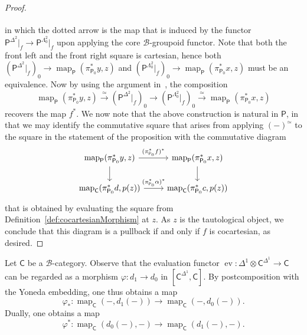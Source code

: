 \documentclass[reqno]{amsart}
\numberwithin{equation}{subsection}
\theoremstyle{plain}
\theoremstyle{definition}
\let\scr=\mathcal
\let\phi=\varphi
\def\BB{\scr B}
\DeclareMathOperator{\ev}{ev}
\DeclareMathOperator{\Map}{map}
\newcommand{\map}[1]{\Map_{#1}}
\newcommand{\I}[1]{\mathsf{#1}}
\newcommand{\iFun}[2]{{[#1,#2]}}
\begin{document}
\begin{proof}
\begin{equation*}
\begin{tikzcd}[column sep={5.8em,between origins}, row sep={4em,between origins}]
		\end{tikzcd}
	\end{equation*}
	in which the dotted arrow is the map that is induced by the functor $\I{P}^{\Delta^2}\vert_f\to \I{P}^{\Lambda^2_0}\vert_f$ upon applying the core $\BB$-groupoid functor. Note that both the front left and the front right square is cartesian, hence both  $(\I{P}^{\Delta^2}\vert_f)_0\to \map{\I{P}}(\pi_{\I{P}_0}^\ast y,z)$ and $(\I{P}^{\Lambda^2_0}\vert_f)_0\to \map{\I{P}}(\pi_{\I{P}_0}^\ast x,z)$ must be an equivalence. Now by using the argument in~\cite[Remark~4.7.7]{Martini2021}, the composition
	\begin{equation*}
	\map{\I{P}}(\pi_{\I{P}_0}^\ast y,z)\xrightarrow{\simeq} (\I{P}^{\Delta^2}\vert_f)_0\rightarrow (\I{P}^{\Lambda^2_0}\vert_f)_0\xrightarrow{\simeq} \map{\I{P}}(\pi_{\I{P}_0}^\ast x,z)
	\end{equation*}
	recovers the map $f^\ast$. We now note that the above construction is natural in $\I{P}$, in that we may identify the commutative square that arises from applying $(-)^\simeq$ to the square in the statement of the proposition with the commutative diagram
	\begin{equation*}
	\begin{tikzcd}
	\map{\I{P}}(\pi_{\I{P}_0}^\ast y,z)\arrow[r, "(\pi_{\I{P}_0}^\ast f)^\ast"] \arrow[d]&  \map{\I{P}}(\pi_{\I{P}_0}^\ast x,z)\arrow[d]\\
	\map{\I{C}}(\pi_{\I{P}_0}^\ast d,p(z))\arrow[r, "(\pi_{\I{P}_0}^\ast \alpha)^\ast"] & \map{\I{C}}(\pi_{\I{P}_0}^\ast c,p(z))
	\end{tikzcd}
	\end{equation*}
	that is obtained by evaluating the square from Definition~\ref{def:cocartesianMorphism} at $z$. As $z$ is the tautological object, we conclude that this diagram is a pullback if and only if $f$ is cocartesian, as desired.
\end{proof}

Let $\I{C}$ be a $\BB$-category. Observe that the evaluation functor $\ev\colon \Delta^1\otimes\I{C}^{\Delta^1}\to\I{C}$ can be regarded as a morphism $\phi\colon d_1\to d_0$ in $\iFun{\I{C}^{\Delta^1}}{\I{C}}$. By postcomposition with the Yoneda embedding, one thus obtains a map
\begin{equation*}
\phi_\ast\colon \map{\I{C}}(-,d_1(-))\to \map{\I{C}}(-,d_0(-)).
\end{equation*}
Dually, one obtains a map
\begin{equation*}
\phi^\ast\colon \map{\I{C}}(d_0(-),-)\to\map{\I{C}}(d_1(-),-).
\end{equation*}
\end{document}
